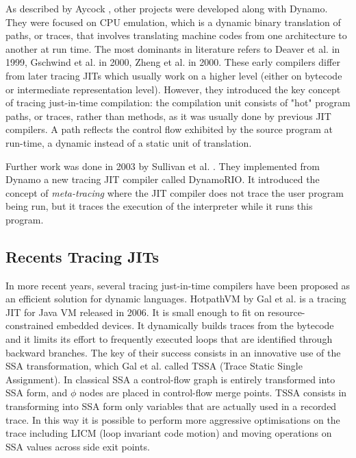 As described by Aycock \cite{aycock2003brief}, other projects were developed along with Dynamo. They were focused on CPU emulation, which is a dynamic binary translation of paths, or traces, that involves translating machine codes from one architecture to another at run time. The most dominants in literature refers to Deaver et al. \cite{deaver1999wiggins} in 1999, Gschwind et al. \cite{gschwind2000dynamic} in 2000, Zheng et al. \cite{zheng2000pa} in 2000. These early compilers differ from later tracing JITs which usually work on a higher level (either on bytecode or intermediate representation level). However, they introduced the key concept of tracing just-in-time compilation: the compilation unit consists of "hot" program paths, or traces, rather than methods, as it was usually done by previous JIT compilers. A path reflects the control flow exhibited by the source program at run-time, a dynamic instead of a static unit of translation.

Further work was done in 2003 by Sullivan et al. \cite{sullivan2003dynamic}. They implemented from Dynamo a new tracing JIT compiler called DynamoRIO. It introduced the concept of \textit{meta-tracing} where the JIT compiler does not trace the user program being run, but it traces the execution of the interpreter while it runs this program.

\subsection{Recents Tracing JITs}
In more recent years, several tracing just-in-time compilers have been proposed as an efficient solution for dynamic languages. HotpathVM by Gal et al. \cite{gal2006hotpathvm} is a tracing JIT for Java VM released in 2006. It is small enough to fit on resource-constrained embedded devices. It dynamically builds traces from the bytecode and it limits its effort to frequently executed loops that are identified through backward branches. The key of their success consists in an innovative use of the SSA \cite{cytron1991efficiently} transformation, which Gal et al. called TSSA (Trace Static Single Assignment). In classical SSA a control-flow graph is entirely transformed into SSA form, and $\phi$ nodes are placed in control-flow merge points. TSSA consists in transforming into SSA form only variables that are actually used in a recorded trace. In this way it is possible to perform more aggressive optimisations on the trace including LICM (loop invariant code motion) and moving operations on SSA values across side exit points.

